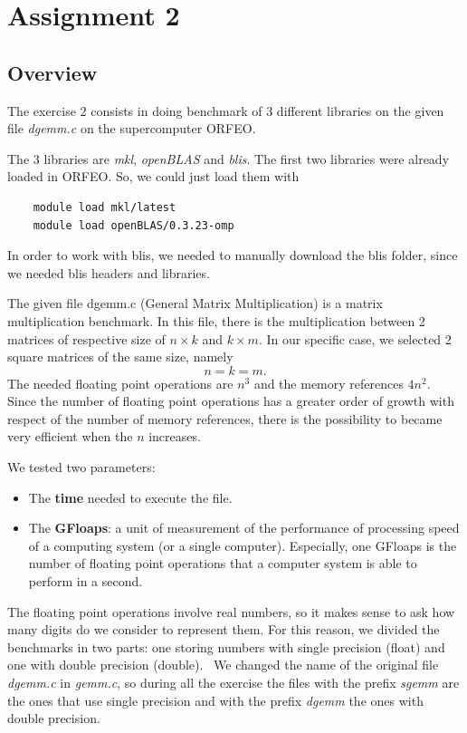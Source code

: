 \documentclass[12pt, titlepage]{report}
\begin{document}
\chapter{Assignment 2}

\section{Overview}
The exercise 2 consists in doing benchmark of 3 different libraries on the given file \textit{dgemm.c} on the supercomputer ORFEO.

The 3 libraries are \textit{mkl}, \textit{openBLAS} and \textit{blis}. The first two libraries were already loaded in ORFEO. So, we could just load them with
\begin{verbatim}
    module load mkl/latest
    module load openBLAS/0.3.23-omp
\end{verbatim}
In order to work with blis, we needed to manually download the blis folder, since we needed blis headers and libraries. 

The given file dgemm.c (General Matrix Multiplication) is a matrix multiplication benchmark. In this file, there is the multiplication between 2 matrices of respective size of $n \times k $ and $ k \times m$. In our specific case, we selected 2 square matrices of the same size, namely 
\begin{equation*}
  n = k = m .   
\end{equation*}
The needed floating point operations are $n^3$ and the memory references $4n^2$. Since the number of floating point operations has a greater order of growth with respect of the number of memory references, there is the possibility to became very efficient when the $n$ increases.

We tested two parameters: 
\begin{itemize}
    \item The \textbf{time} needed to execute the file.
    \item The \textbf{GFloaps}: a unit of measurement of the performance of processing speed of a computing system (or a single computer). Especially, one GFloaps is the number of floating point operations that a computer system is able to perform in a second. 
\end{itemize}
The floating point operations involve real numbers, so it makes sense to ask how many digits do we consider to represent them. For this reason, we divided the benchmarks in two parts: one storing numbers with single precision (float) and one with double precision (double). \
We changed the name of the original file \textit{dgemm.c} in \textit{gemm.c}, so during all the exercise the files with the prefix \textit{sgemm} are the ones that use single precision and with the prefix \textit{dgemm} the ones with double precision. 
\end{document}
